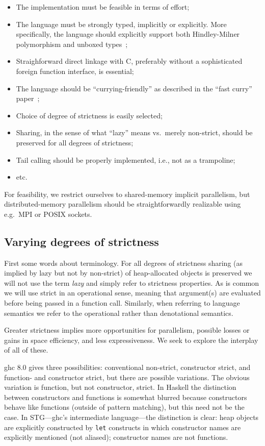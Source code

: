 \documentclass{llncs}
\begin{document}
\begin{itemize}
\item The implementation must be feasible in terms of effort;
\item The language must be strongly typed, implicitly or explicitly.  More
  specifically, the language should explicitly support both Hindley-Milner
  polymorphism and unboxed types~\cite{firstclass};
\item Straighforward direct linkage with C, preferably without a sophisticated
  foreign function interface, is essential;
\item The language should be ``currying-friendly'' as described in the ``fast
  curry'' paper~\cite{fastcurry};
\item Choice of degree of strictness is easily selected;
\item Sharing, in the sense of what ``lazy'' means vs.\ merely non-strict,
  should be preserved for all degrees of strictness;
\item Tail calling should be properly implemented, i.e., not as a trampoline;
\item etc.
\end{itemize}

For feasibility, we restrict ourselves to shared-memory implicit parallelism,
but distributed-memory parallelism should be straightforwardly realizable
using e.g.\ MPI or POSIX sockets.

\subsection{Varying degrees of strictness}

First some words about terminology.  For all degrees of strictness sharing (as
implied by lazy but not by non-strict) of heap-allocated objects is preserved
we will not use the term \emph{lazy} and simply refer to strictness
properties.  As is common we will use strict in an operational sense, meaning
that argument(s) are evaluated before being passed in a function call.
Similarly, when referring to language semantics we refer to the operational
rather than denotational semantics.

Greater strictness implies more opportunities for parallelism, possible losses
or gains in space efficiency, and less expressiveness.  We seek to explore
the interplay of all of these.

ghc 8.0 gives three possibilities: conventional non-strict, constructor
strict, and function- and constructor strict, but there are possible
variations.  The obvious variation is function, but not constructor, strict.
In Haskell the distinction between constructors and functions is somewhat
blurred because constructors behave like functions (outside of pattern
matching), but this need not be the case.  In STG---ghc's intermediate
language---the distinction is clear: heap objects are explicitly constructed
by \texttt{let} constructs in which constructor names are explicitly mentioned
(not aliased); constructor names are not functions.
\end{document}
